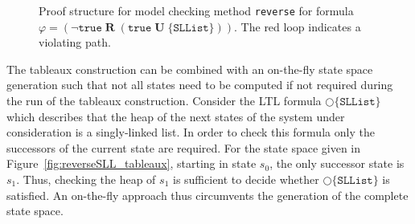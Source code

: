 \documentclass[a4paper, 12pt, twoside]{report}
\begin{document}
\begin{figure}
\begin{center}
{}
			\caption{Proof structure for model checking method \texttt{reverse} for formula $\varphi=(\neg\texttt{true}\;\textbf{R}\;(\texttt{true}\;\textbf{U}\;\{\texttt{SLList}\}))$. The red loop indicates a violating path.}\label{fig:tableaux_ps}
		\end{center}
	\end{figure}
	
	The tableaux construction can be combined with an on-the-fly state space generation such that not all states need to be computed if not required during the run of the tableaux construction. Consider the LTL formula $\bigcirc\{\texttt{SLList}\}$ which describes that the heap of the next states of the system under consideration is a singly-linked list. In order to check this formula only the successors of the current state are required. For the state space given in Figure~\ref{fig:reverseSLL_tableaux}, starting in state $s_0$, the only successor state is $s_1$. Thus, checking the heap of $s_1$ is sufficient to decide whether $\bigcirc\{\texttt{SLList}\}$ is satisfied. An on-the-fly approach thus circumvents the generation of the complete state space.\\	
	
\end{document}
